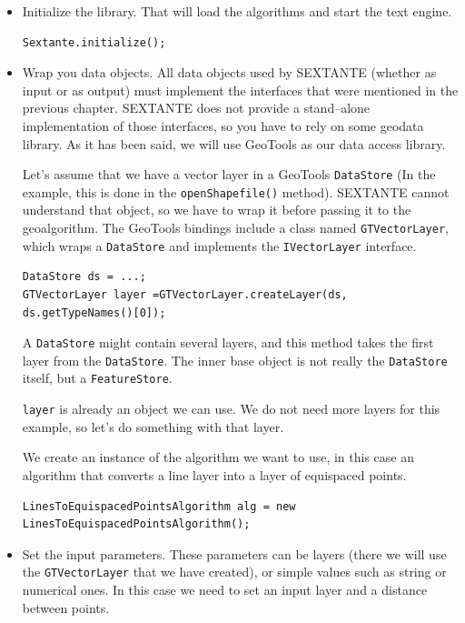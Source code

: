 \begin{itemize}
\item Initialize the library. That will load the algorithms and start the text engine.

\begin{verbatim}
Sextante.initialize();
\end{verbatim}

\item Wrap you data objects. All data objects used by SEXTANTE (whether as input or as output) must implement the interfaces that were mentioned in the previous chapter. SEXTANTE does not provide a stand--alone implementation of those interfaces, so you have to rely on some geodata library. As it has been said, we will use GeoTools as our data access library.

Let's assume that we have a vector layer in a GeoTools \texttt{DataStore} (In the example, this is done in the \texttt{openShapefile()} method). SEXTANTE cannot understand that object, so we have to wrap it before passing it to the geoalgorithm. The GeoTools bindings include a class named \texttt{GTVectorLayer}, which wraps a \texttt{DataStore} and implements the \texttt{IVectorLayer} interface.

\begin{verbatim}
DataStore ds = ...;
GTVectorLayer layer =GTVectorLayer.createLayer(ds, ds.getTypeNames()[0]);
\end{verbatim}

A \texttt{DataStore} might contain several layers, and this method takes the first layer from the \texttt{DataStore}. The inner base object is not really the \texttt{DataStore} itself, but a \texttt{FeatureStore}.

\texttt{layer} is already an object we can use. We do not need more layers for this example, so let's do something with that layer. 

We create an instance of the algorithm we want to use, in this case an algorithm that converts a line layer into a layer of equispaced points.

\begin{verbatim}
LinesToEquispacedPointsAlgorithm alg = new LinesToEquispacedPointsAlgorithm();
\end{verbatim}

\item Set the input parameters. These parameters can be layers (there we will use the \texttt{GTVectorLayer} that we have created), or simple values such as string or numerical ones. In this case we need to set an input layer and a distance between points.


\end{itemize}
